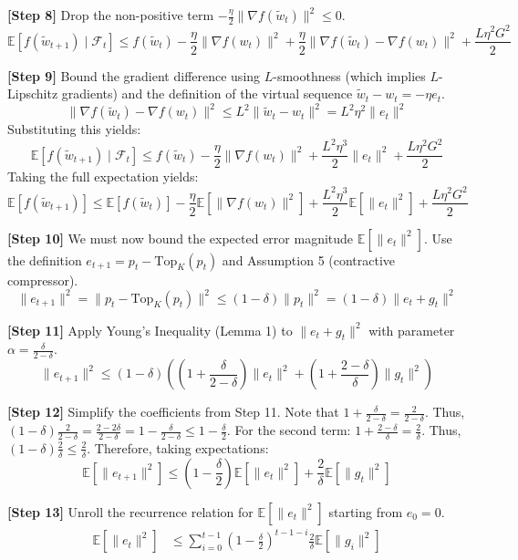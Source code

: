 \documentclass{article}
\begin{document}
\textbf{[Step 8]} Drop the non-positive term $-\frac{\eta}{2}\|\nabla f(\tilde{w}_t)\|^2 \leq 0$.
$$ \mathbb{E}[f(\tilde{w}_{t+1}) \mid \mathcal{F}_t] \leq f(\tilde{w}_t) - \frac{\eta}{2}\|\nabla f(w_t)\|^2 + \frac{\eta}{2}\|\nabla f(\tilde{w}_t) - \nabla f(w_t)\|^2 + \frac{L\eta^2 G^2}{2} $$

\textbf{[Step 9]} Bound the gradient difference using $L$-smoothness (which implies $L$-Lipschitz gradients) and the definition of the virtual sequence $\tilde{w}_t - w_t = -\eta e_t$.
$$ \|\nabla f(\tilde{w}_t) - \nabla f(w_t)\|^2 \leq L^2 \|\tilde{w}_t - w_t\|^2 = L^2 \eta^2 \|e_t\|^2 $$
Substituting this yields:
$$ \mathbb{E}[f(\tilde{w}_{t+1}) \mid \mathcal{F}_t] \leq f(\tilde{w}_t) - \frac{\eta}{2}\|\nabla f(w_t)\|^2 + \frac{L^2 \eta^3}{2} \|e_t\|^2 + \frac{L\eta^2 G^2}{2} $$
Taking the full expectation yields:
$$ \mathbb{E}[f(\tilde{w}_{t+1})] \leq \mathbb{E}[f(\tilde{w}_t)] - \frac{\eta}{2}\mathbb{E}[\|\nabla f(w_t)\|^2] + \frac{L^2 \eta^3}{2} \mathbb{E}[\|e_t\|^2] + \frac{L\eta^2 G^2}{2} $$

\textbf{[Step 10]} We must now bound the expected error magnitude $\mathbb{E}[\|e_t\|^2]$. Use the definition $e_{t+1} = p_t - \text{Top}_K(p_t)$ and Assumption 5 (contractive compressor).
$$ \|e_{t+1}\|^2 = \|p_t - \text{Top}_K(p_t)\|^2 \leq (1 - \delta)\|p_t\|^2 = (1 - \delta)\|e_t + g_t\|^2 $$

\textbf{[Step 11]} Apply Young's Inequality (Lemma 1) to $\|e_t + g_t\|^2$ with parameter $\alpha = \frac{\delta}{2 - \delta}$.
$$ \|e_{t+1}\|^2 \leq (1 - \delta) \left( \left(1 + \frac{\delta}{2-\delta}\right)\|e_t\|^2 + \left(1 + \frac{2-\delta}{\delta}\right)\|g_t\|^2 \right) $$

\textbf{[Step 12]} Simplify the coefficients from Step 11.
Note that $1 + \frac{\delta}{2-\delta} = \frac{2}{2-\delta}$. Thus, $(1-\delta)\frac{2}{2-\delta} = \frac{2-2\delta}{2-\delta} = 1 - \frac{\delta}{2-\delta} \leq 1 - \frac{\delta}{2}$.
For the second term: $1 + \frac{2-\delta}{\delta} = \frac{2}{\delta}$. Thus, $(1-\delta)\frac{2}{\delta} \leq \frac{2}{\delta}$.
Therefore, taking expectations:
$$ \mathbb{E}[\|e_{t+1}\|^2] \leq \left(1 - \frac{\delta}{2}\right) \mathbb{E}[\|e_t\|^2] + \frac{2}{\delta} \mathbb{E}[\|g_t\|^2] $$

\textbf{[Step 13]} Unroll the recurrence relation for $\mathbb{E}[\|e_t\|^2]$ starting from $e_0 = 0$.
\begin{align*}
    \mathbb{E}[\|e_t\|^2] &\leq \sum_{i=0}^{t-1} \left(1 - \frac{\delta}{2}\right)^{t-1-i} \frac{2}{\delta} \mathbb{E}[\|g_i\|^2]
\end{align*}
\end{document}
